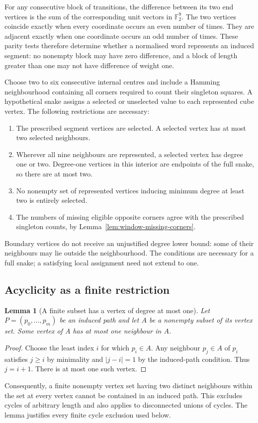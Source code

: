 \documentclass[11pt,a4paper]{article}
\newtheorem{lemma}[theorem]{Lemma}
\theoremstyle{definition}
\theoremstyle{remark}
\begin{document}
For any consecutive block of transitions, the difference between its two end vertices is the sum of the corresponding unit vectors in $\mathbb F_2^9$. The two vertices coincide exactly when every coordinate occurs an even number of times. They are adjacent exactly when one coordinate occurs an odd number of times. These parity tests therefore determine whether a normalised word represents an induced segment: no nonempty block may have zero difference, and a block of length greater than one may not have difference of weight one.

Choose two to six consecutive internal centres and include a Hamming neighbourhood containing all corners required to count their singleton squares. A hypothetical snake assigns a selected or unselected value to each represented cube vertex. The following restrictions are necessary:
\begin{enumerate}
\item The prescribed segment vertices are selected. A selected vertex has at most two selected neighbours.
\item Wherever all nine neighbours are represented, a selected vertex has degree one or two. Degree-one vertices in this interior are endpoints of the full snake, so there are at most two.
\item No nonempty set of represented vertices inducing minimum degree at least two is entirely selected.
\item The numbers of missing eligible opposite corners agree with the prescribed singleton counts, by Lemma~\ref{lem:window-missing-corners}.
\end{enumerate}
Boundary vertices do not receive an unjustified degree lower bound: some of their neighbours may lie outside the neighbourhood. The conditions are necessary for a full snake; a satisfying local assignment need not extend to one.

\subsection{Acyclicity as a finite restriction}
\begin{lemma}[A finite subset has a vertex of degree at most one]\label{lem:subset-low-degree}
Let $P=(p_0,\ldots,p_m)$ be an induced path and let $A$ be a nonempty subset of its vertex set. Some vertex of $A$ has at most one neighbour in $A$.
\end{lemma}
\begin{proof}
Choose the least index $i$ for which $p_i\in A$. Any neighbour $p_j\in A$ of $p_i$ satisfies $j\ge i$ by minimality and $|j-i|=1$ by the induced-path condition. Thus $j=i+1$. There is at most one such vertex.
\end{proof}
Consequently, a finite nonempty vertex set having two distinct neighbours within the set at every vertex cannot be contained in an induced path. This excludes cycles of arbitrary length and also applies to disconnected unions of cycles. The lemma justifies every finite cycle exclusion used below.
\end{document}
